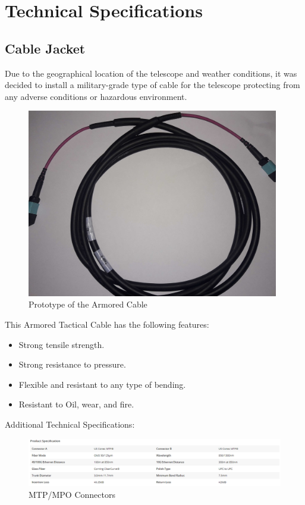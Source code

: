 \newpage
\section{Technical Specifications}

\subsection{Cable Jacket}

  Due to the geographical location of the telescope and weather conditions, it was decided to install a military-grade type of cable for the telescope protecting from any adverse conditions or hazardous environment. 

\begin{figure}
  \includegraphics[width=11cm]{images/mtp_militar_cable.jpg}
  \centering
  \caption{Prototype of the Armored Cable}
  \label{fig:jlsimon}
\end{figure}

This Armored Tactical Cable has the following features:

\begin{itemize}
  \item Strong tensile strength.
  \item Strong resistance to pressure.
  \item Flexible and resistant to any type of bending.
  \item Resistant to Oil, wear, and fire.

\end{itemize}

\newpage
Additional Technical Specifications:

\begin{figure}
  \includegraphics[width=\textwidth]{images/2.png}
  \caption{MTP/MPO Connectors}
  \label{fig:jlsimon}
\end{figure}


